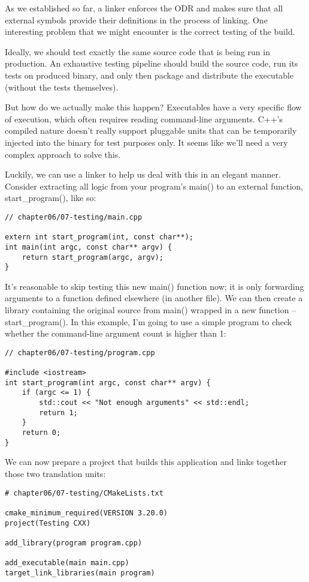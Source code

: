 As we established so far, a linker enforces the ODR and makes sure that all external symbols provide their definitions in the process of linking. One interesting problem that we might encounter is the correct testing of the build.

Ideally, we should test exactly the same source code that is being run in production. An exhaustive testing pipeline should build the source code, run its tests on produced binary, and only then package and distribute the executable (without the tests themselves).

But how do we actually make this happen? Executables have a very specific flow of execution, which often requires reading command-line arguments. C++'s compiled nature doesn't really support pluggable units that can be temporarily injected into the binary for test purposes only. It seems like we'll need a very complex approach to solve this.

Luckily, we can use a linker to help us deal with this in an elegant manner. Consider extracting all logic from your program's main() to an external function, start\_program(), like so:

\begin{lstlisting}[style=styleCXX]
// chapter06/07-testing/main.cpp

extern int start_program(int, const char**);
int main(int argc, const char** argv) {
	return start_program(argc, argv);
}
\end{lstlisting}

It's reasonable to skip testing this new main() function now; it is only forwarding arguments to a function defined elsewhere (in another file). We can then create a library containing the original source from main() wrapped in a new function – start\_program(). In this example, I'm going to use a simple program to check whether the command-line argument count is higher than 1:

\begin{lstlisting}[style=styleCXX]
// chapter06/07-testing/program.cpp

#include <iostream>
int start_program(int argc, const char** argv) {
	if (argc <= 1) {
		std::cout << "Not enough arguments" << std::endl;
		return 1;
	}
	return 0;
}
\end{lstlisting}

We can now prepare a project that builds this application and links together those two translation units:

\begin{lstlisting}[style=styleCMake]
# chapter06/07-testing/CMakeLists.txt

cmake_minimum_required(VERSION 3.20.0)
project(Testing CXX)

add_library(program program.cpp)

add_executable(main main.cpp)
target_link_libraries(main program)
\end{lstlisting}


